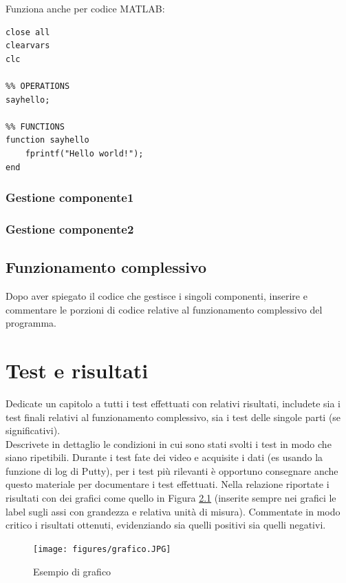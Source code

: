 \documentclass[11pt]{report}
\begin{document}


Funziona anche per codice MATLAB:
\begin{lstlisting}[language=MATLABc, caption="Codice in MATLAB"]
%% PREPARE WORKSPACE
close all
clearvars
clc

%% OPERATIONS
sayhello;

%% FUNCTIONS
function sayhello
    fprintf("Hello world!");
end

\end{lstlisting}


\subsection{Gestione componente1}

\subsection{Gestione componente2}

\section{Funzionamento complessivo}
Dopo aver spiegato il codice che gestisce i singoli componenti, inserire e commentare le porzioni di codice relative al funzionamento complessivo del programma.

\chapter{Test e risultati}
Dedicate un capitolo a tutti i test effettuati con relativi risultati, includete sia i test finali relativi al funzionamento complessivo, sia i test delle singole parti (se significativi). \\
Descrivete in dettaglio le condizioni in cui sono stati svolti i test in modo che siano ripetibili. Durante i test fate dei video e acquisite i dati (es usando la funzione di log di Putty), per i test più rilevanti è opportuno consegnare anche questo materiale per documentare i test effettuati. Nella relazione riportate i risultati con dei grafici come quello in Figura \ref{fig:grafico} (inserite sempre nei grafici le label sugli assi con grandezza e relativa unità di misura). Commentate in modo critico i risultati ottenuti, evidenziando sia quelli positivi sia quelli negativi. 

\begin{figure}[H]
\centering
\texttt{[image: figures/grafico.JPG]}
\caption{Esempio di grafico}
\label{fig:grafico}
\end{figure}
\end{document}
